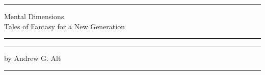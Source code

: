 \thispagestyle{empty}
\begin{center}
	\noindent\rule{\textwidth}{2pt}

	\vspace{10pt}
	{\Huge Mental Dimensions} \\

	\vspace{.5em}
	{\large Tales of Fantasy for a New Generation} \\

	\vspace{.5em}
	\noindent\rule{\textwidth}{2pt}

	\vspace{6in}
	\rule{\textwidth}{2pt}

	\vspace{.5em}
	{\large by Andrew G. Alt}

	\rule{\textwidth}{2pt}
\end{center}
